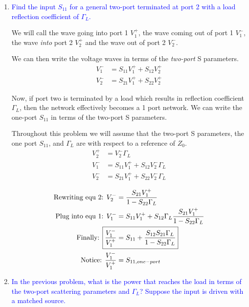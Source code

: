 \begin{enumerate}[label=(\alph*)]
    \item \textcolor{blue}{Find the input $S_{11}$ for a general two-port terminated at port 2 with a load reflection coefficient of $\Gamma_L$.}

    We will call the wave going into port 1 $V_1^+$, the wave coming out of port 1 $V_1^-$, the wave \emph{into} port 2 $V_2^+$ and the wave out of port 2 $V_2^-$.

    We can then write the voltage waves in terms of the \emph{two-port} S parameters.
    \begin{align*}
        V_1^- &= S_{11} V_1^+ + S_{12} V_2^+ \\
        V_2^- &= S_{21} V_1^+ + S_{22} V_2^+
    \end{align*}

    Now, if port two is terminated by a load which results in reflection coefficient $\Gamma_L$, then the network effectively becomes a 1 port network. We can write the one-port $S_{11}$ in terms of the two-port S parameters.

    Throughout this problem we will assume that the two-port S parameters, the one port $S_{11}$, and $\Gamma_L$ are with respect to a reference of $Z_0$.
    \begin{align}
        V_2^+ &= V_2^- \Gamma_L \nonumber \\
        V_1^- &= S_{11} V_1^+ + S_{12} V_2^- \Gamma_L \\
        V_2^- &= S_{21} V_1^+ + S_{22} V_2^- \Gamma_L
    \end{align}

    \begin{align*}
        \text{Rewriting equ 2: } V_2^- &= \frac{S_{21} V_1^+}{1 - S_{22}\Gamma_L} \\
        \text{Plug into equ 1: } V_1^- &= S_{11}V_1^+ + S_{12}\Gamma_L \frac{S_{21} V_1^+}{1 - S_{22}\Gamma_L} \\
        \text{Finally: } \Aboxed{\frac{V_1^-}{V_1^+} &= S_{11} + \frac{S_{12}S_{21}\Gamma_L}{1 - S_{22}\Gamma_L}} \\
        \text{Notice: } \frac{V_1^-}{V_1^+} &= S_{11,one-port}
    \end{align*}

\item \textcolor{blue}{In the previous problem, what is the power that reaches the load in terms of the two-port scattering parameters and $\Gamma_L$? Suppose the input is driven with a matched source.}


\end{enumerate}
